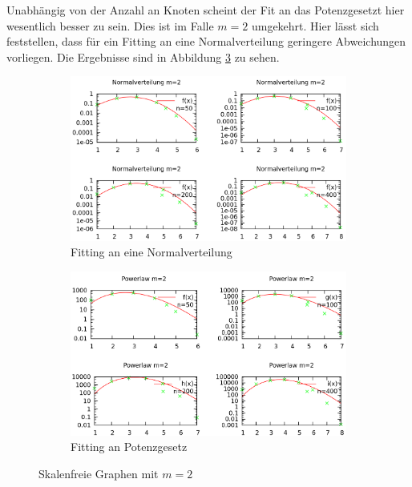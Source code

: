 \documentclass[10pt]{article}
\begin{document}
Unabhängig von der Anzahl an Knoten scheint der Fit an das Potenzgesetzt hier wesentlich besser zu sein. Dies ist im Falle $m=2$ umgekehrt. Hier lässt sich feststellen, dass für ein Fitting an eine Normalverteilung geringere Abweichungen vorliegen. Die Ergebnisse sind in Abbildung \ref{fig:m2} zu sehen.

\begin{figure}[h!]
\begin{subfigure}{.5\textwidth}
  \centering
  \includegraphics[width=1\linewidth]{../Results/Normal_M2_logscale.png}
  \caption{Fitting an eine Normalverteilung}
  \label{fig:sfig1}
\end{subfigure}%
\begin{subfigure}{.5\textwidth}
  \centering
  \includegraphics[width=1\linewidth]{../Results/Power_M2_logscale.png}
  \caption{Fitting an Potenzgesetz}
  \label{fig:sfig2}
\end{subfigure}
\caption{Skalenfreie Graphen mit $m=2$}
\label{fig:m2}
\end{figure}
\end{document}
